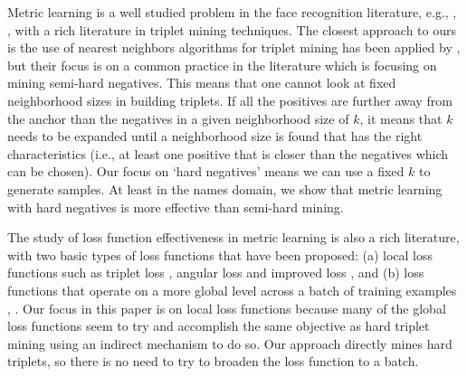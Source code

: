 Metric learning is a well studied problem in the face recognition literature, e.g., \cite{DBLP:conf/cvpr/2014}, \cite{DBLP:conf/cvpr/SchroffKP15}, with a rich literature in triplet mining techniques.  The closest approach to ours is the use of nearest neighbors algorithms for triplet mining has been applied by \cite{DBLP:journals/corr/KumarHC0D17}, but their focus is on a common practice in the literature which is focusing on mining semi-hard negatives.  This means that one cannot look at fixed neighborhood sizes in building triplets.  If all the positives are further away from the anchor than the negatives in a given neighborhood size of $k$, it means that $k$ needs to be expanded until a neighborhood size is found that has the right characteristics (i.e., at least one positive that is closer than the negatives which can be chosen).  Our focus on `hard negatives' means we can use a fixed $k$ to generate samples.  At least in the names domain, we show that metric learning with hard negatives is more effective than semi-hard mining.

The study of loss function effectiveness in metric learning is also a rich literature, with two basic types of loss functions that have been proposed: (a) local loss functions such as triplet loss \cite{DBLP:conf/cvpr/SchroffKP15}, angular loss \cite{Zhang:2016:DML:3088616.3088665} and improved loss \cite{DBLP:journals/corr/abs-1708-01682}, and (b) loss functions that operate on a more global level across a batch of training examples \cite{NIPS2016_6200}, \cite{songCVPR17}.  Our focus in this paper is on local loss functions because many of the global loss functions seem to try and accomplish the same objective as hard triplet mining \cite{songCVPR17} using an indirect mechanism to do so.  Our approach directly mines hard triplets, so there is no need to try to broaden the loss function to a batch.
